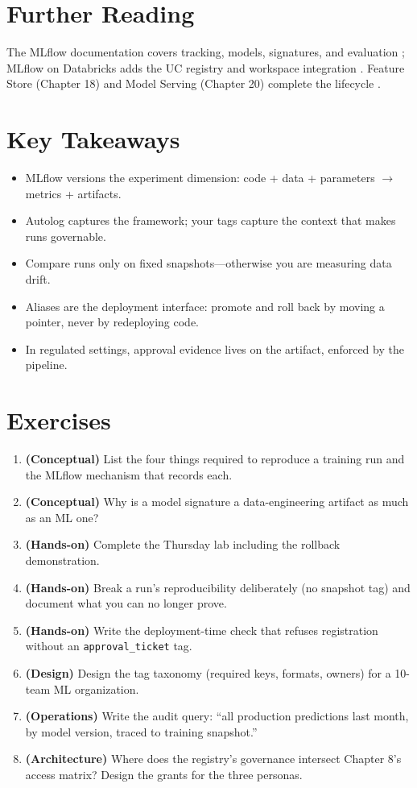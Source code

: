 \section{Further Reading}
The MLflow documentation covers tracking, models, signatures, and evaluation \cite{mlflowDocs}; MLflow on Databricks adds the UC registry and workspace integration \cite{databricksMLflow}. Feature Store (Chapter 18) and Model Serving (Chapter 20) complete the lifecycle \cite{databricksFeatureStore,databricksModelServing}.

\section*{Key Takeaways}
\begin{itemize}
    \item MLflow versions the experiment dimension: code + data + parameters $\rightarrow$ metrics + artifacts.
    \item Autolog captures the framework; your tags capture the context that makes runs governable.
    \item Compare runs only on fixed snapshots---otherwise you are measuring data drift.
    \item Aliases are the deployment interface: promote and roll back by moving a pointer, never by redeploying code.
    \item In regulated settings, approval evidence lives on the artifact, enforced by the pipeline.
\end{itemize}

\section{Exercises}
\begin{enumerate}
    \item \textbf{(Conceptual)} List the four things required to reproduce a training run and the MLflow mechanism that records each.
    \item \textbf{(Conceptual)} Why is a model signature a data-engineering artifact as much as an ML one?
    \item \textbf{(Hands-on)} Complete the Thursday lab including the rollback demonstration.
    \item \textbf{(Hands-on)} Break a run's reproducibility deliberately (no snapshot tag) and document what you can no longer prove.
    \item \textbf{(Hands-on)} Write the deployment-time check that refuses registration without an \texttt{approval\_ticket} tag.
    \item \textbf{(Design)} Design the tag taxonomy (required keys, formats, owners) for a 10-team ML organization.
    \item \textbf{(Operations)} Write the audit query: ``all production predictions last month, by model version, traced to training snapshot.''
    \item \textbf{(Architecture)} Where does the registry's governance intersect Chapter 8's access matrix? Design the grants for the three personas.
\end{enumerate}
